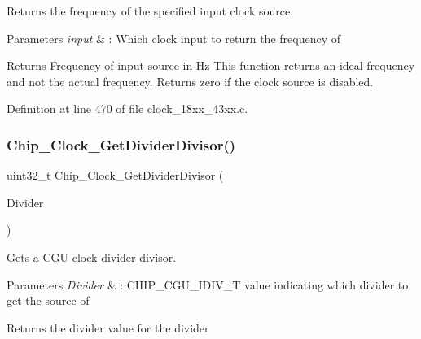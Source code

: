 Returns the frequency of the specified input clock source. 


\begin{DoxyParams}{Parameters}
{\em input} & \+: Which clock input to return the frequency of \\
\hline
\end{DoxyParams}
\begin{DoxyReturn}{Returns}
Frequency of input source in Hz This function returns an ideal frequency and not the actual frequency. Returns zero if the clock source is disabled. 
\end{DoxyReturn}


Definition at line 470 of file clock\+\_\+18xx\+\_\+43xx.\+c.

\mbox{\label{group___c_l_o_c_k__18_x_x__43_x_x_gaeecd015038258f1cc4f746054268d94f}} 
\subsubsection{\texorpdfstring{Chip\+\_\+\+Clock\+\_\+\+Get\+Divider\+Divisor()}{Chip\_Clock\_GetDividerDivisor()}}
{\footnotesize\ttfamily uint32\+\_\+t Chip\+\_\+\+Clock\+\_\+\+Get\+Divider\+Divisor (\begin{DoxyParamCaption}\item[{\hyperlink{chip__clocks_8h_a588e8716294cc2deec5d583add455521}{C\+H\+I\+P\+\_\+\+C\+G\+U\+\_\+\+I\+D\+I\+V\+\_\+T}}]{Divider }\end{DoxyParamCaption})}



Gets a C\+GU clock divider divisor. 


\begin{DoxyParams}{Parameters}
{\em Divider} & \+: C\+H\+I\+P\+\_\+\+C\+G\+U\+\_\+\+I\+D\+I\+V\+\_\+T value indicating which divider to get the source of \\
\hline
\end{DoxyParams}
\begin{DoxyReturn}{Returns}
the divider value for the divider 
\end{DoxyReturn}


